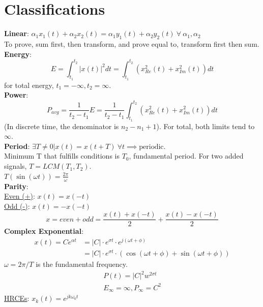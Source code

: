 \documentclass[8pt]{extarticle}
\begin{document}
\section*{Classifications}
\pagestyle{empty}
\textbf{Linear}: $\alpha_1 x_1(t)+\alpha_2 x_2(t) = \alpha_1 y_1(t)+\alpha_2 y_2(t) ~\forall~ \alpha_1,\alpha_2$\\
To prove, sum first, then transform, and prove equal to, transform first then sum.\\
\textbf{Energy}:
\begin{equation*}
    E = \int_{t_1}^{t_2} |x(t)|^2 dt = \int_{t_1}^{t_2}(x^2_{Re}(t)+x^2_{Im}(t))dt
\end{equation*}
for total energy, $t_1=-\infty, t_2 = \infty$.\\
\textbf{Power}:
\begin{equation*}
    P_{avg} = \frac{1}{t_2-t_1}E = \frac{1}{t_2-t_1}\int_{t_1}^{t_2}(x^2_{Re}(t)+x^2_{Im}(t))dt
\end{equation*}
(In discrete time, the denominator is $n_2-n_1+1$). For total, both limits tend to $\infty$.\\
\textbf{Period}: $\exists T \neq 0 | x(t) = x(t+T) ~\forall t \implies \text{periodic}$.\\
Minimum T that fulfills conditions is $T_0$, fundamental period.
For two added signals, $T = LCM(T_1,T_2)$.\\
$T(\sin(\omega t)) = \frac{2\pi}{\omega}$\\
\textbf{Parity}:\\
\underline{Even (+)}: $x(t)=x(-t)$\\
\underline{Odd (-)}: $x(t) = -x(-t)$\\
\begin{equation*}
    x = even+odd = \frac{x(t)+x(-t)}{2}+\frac{x(t)-x(-t)}{2}
\end{equation*}
\textbf{Complex Exponential}:
\begin{align*}
    x(t) = Ce^{\alpha t} & = |C|\cdot e^{\sigma t}\cdot e^{j(\omega t +\phi)}                       \\
                         & = |C|\cdot e^{\sigma t}\cdot (\cos(\omega t +\phi)+\sin(\omega t +\phi))
\end{align*}
$\omega = 2\pi/T$ is the fundamental frequency.
\begin{align*}
    P(t) = |C|^2w^{2\sigma t} \\
    E_\infty = \infty , P_\infty = C^2
\end{align*}
\underline{HRCEs}: $x_k(t) = e^{jk\omega_0 t}$
\end{document}
